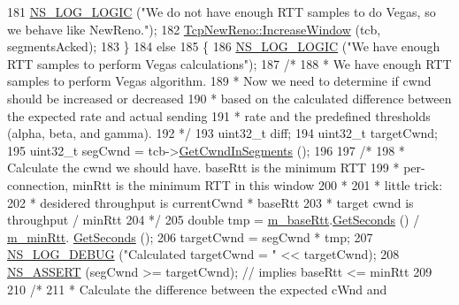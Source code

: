 \begin{DoxyCode}
181           \hyperlink{group__logging_ga88acd260151caf2db9c0fc84997f45ce}{NS\_LOG\_LOGIC} (\textcolor{stringliteral}{"We do not have enough RTT samples to do Vegas, so we behave like
       NewReno."});
182           \hyperlink{classns3_1_1TcpNewReno_a11db8ae90f4cebacc15524a793b0741a}{TcpNewReno::IncreaseWindow} (tcb, segmentsAcked);
183         \}
184       \textcolor{keywordflow}{else}
185         \{
186           \hyperlink{group__logging_ga88acd260151caf2db9c0fc84997f45ce}{NS\_LOG\_LOGIC} (\textcolor{stringliteral}{"We have enough RTT samples to perform Vegas calculations"});
187           \textcolor{comment}{/*}
188 \textcolor{comment}{           * We have enough RTT samples to perform Vegas algorithm.}
189 \textcolor{comment}{           * Now we need to determine if cwnd should be increased or decreased}
190 \textcolor{comment}{           * based on the calculated difference between the expected rate and actual sending}
191 \textcolor{comment}{           * rate and the predefined thresholds (alpha, beta, and gamma).}
192 \textcolor{comment}{           */}
193           uint32\_t diff;
194           uint32\_t targetCwnd;
195           uint32\_t segCwnd = tcb->\hyperlink{classns3_1_1TcpSocketState_ab6dfe309ca53fd3207dcafede75ad12d}{GetCwndInSegments} ();
196 
197           \textcolor{comment}{/*}
198 \textcolor{comment}{           * Calculate the cwnd we should have. baseRtt is the minimum RTT}
199 \textcolor{comment}{           * per-connection, minRtt is the minimum RTT in this window}
200 \textcolor{comment}{           *}
201 \textcolor{comment}{           * little trick:}
202 \textcolor{comment}{           * desidered throughput is currentCwnd * baseRtt}
203 \textcolor{comment}{           * target cwnd is throughput / minRtt}
204 \textcolor{comment}{           */}
205           \textcolor{keywordtype}{double} tmp = \hyperlink{classns3_1_1TcpVegas_ae283bcc32d2d92002477abafd1ca5132}{m\_baseRtt}.\hyperlink{classns3_1_1Time_a8f20d5c3b0902d7b4320982f340b57c8}{GetSeconds} () / \hyperlink{classns3_1_1TcpVegas_aba6a10d787820b6907313b79cc16582c}{m\_minRtt}.
      \hyperlink{classns3_1_1Time_a8f20d5c3b0902d7b4320982f340b57c8}{GetSeconds} ();
206           targetCwnd = segCwnd * tmp;
207           \hyperlink{group__logging_ga413f1886406d49f59a6a0a89b77b4d0a}{NS\_LOG\_DEBUG} (\textcolor{stringliteral}{"Calculated targetCwnd = "} << targetCwnd);
208           \hyperlink{assert_8h_a6dccdb0de9b252f60088ce281c49d052}{NS\_ASSERT} (segCwnd >= targetCwnd); \textcolor{comment}{// implies baseRtt <= minRtt}
209 
210           \textcolor{comment}{/*}
211 \textcolor{comment}{           * Calculate the difference between the expected cWnd and}

\end{DoxyCode}
